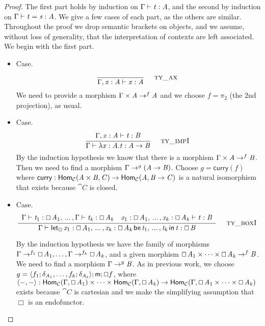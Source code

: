 \begin{proof}
  The first part holds by induction on $\Gamma  \vdash  \TLLnt{t}  \TLLsym{:}  \TLLnt{A}$, and the
  second by induction on $ \Gamma  \vdash  \TLLnt{t}  =  \TLLnt{s}  :  \TLLnt{A} $.  We give a few cases of each part, as the others are similar.  Throughout the proof we
  drop semantic brackets on objects, and we assume, without loss of
  generality, that the interpretation of contexts are left associated.
  We begin with the first part.

  \begin{itemize}
  \item[] Case.\\
    \[
    \TLLdruletyXXax{}
    \]
    We need to provide a morphism $\Gamma \times \TLLnt{A} \mto^{f}
    \TLLnt{A}$ and we choose $f = \pi_2$ (the $2$nd projection), as usual.

    \item[] Case.\\
    \[
    \TLLdruletyXXimpI{}
    \]
    By the induction hypothesis we know that there is a morphism
    $\Gamma \times \TLLnt{A} \mto^f \TLLnt{B}$.  Then we need  to find a
    morphism $\Gamma \mto^{g} (\TLLnt{A}  \to  \TLLnt{B})$.  Choose $g =
    \mathsf{curry}(f)$ where $\mathsf{curry} :
    \mathsf{Hom}_{\cat{C}}( \TLLnt{A}  \times  \TLLnt{B} ,\TLLnt{C}) \mto
    \mathsf{Hom}_{\cat{C}}(\TLLnt{A},\TLLnt{B}  \to  \TLLnt{C})$ is a natural isomorphism
    that exists because $\cat{C}$ is closed.

  \item[] Case.\\
    \[
    \TLLdruletyXXboxI{}
    \]

    By the induction hypothesis we have the family of morphisms $\Gamma
    \mto^{f_1} \Box \, \TLLnt{A_{{\mathrm{1}}}}, \ldots, \Gamma \mto^{f_k} \Box \, \TLLnt{A_{\TLLmv{k}}}$, and a given morphism
    $\Box \, \TLLnt{A_{{\mathrm{1}}}} \times \cdots \times \Box \, \TLLnt{A_{\TLLmv{k}}} \mto^f \TLLnt{B}$.  We need 
     to find a morphism $\Gamma \mto^{g} \TLLnt{B}$.  As in previous work, we choose $g =
    \langle f_1;\delta_{\TLLnt{A_{{\mathrm{1}}}}},\ldots,f_k;\delta_{\TLLnt{A_{\TLLmv{k}}}} \rangle;\mathsf{m};\Box f$, where $\langle -,-\rangle :
    \mathsf{Hom}_{\cat{C}}(\Gamma,\Box \, \TLLnt{A_{{\mathrm{1}}}}) \times \cdots \times
    \mathsf{Hom}_{\cat{C}}(\Gamma,\Box \, \TLLnt{A_{\TLLmv{k}}}) \mto \mathsf{Hom}_{\cat{C}}(\Gamma,\Box \, \TLLnt{A_{{\mathrm{1}}}}
    \times \cdots \times \Box \, \TLLnt{A_{\TLLmv{k}}})$ exists because $\cat{C}$ is cartesian and we make the simplifying assumption that $\Box$ is an endofunctor.


\end{itemize}
\end{proof}
